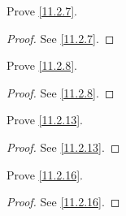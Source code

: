 \exercisesection

\begin{ex}\label{ex:11.2.1}
  Prove \cref{11.2.7}.
\end{ex}

\begin{proof}
  See \cref{11.2.7}.
\end{proof}

\begin{ex}\label{ex:11.2.2}
  Prove \cref{11.2.8}.
\end{ex}

\begin{proof}
  See \cref{11.2.8}.
\end{proof}

\begin{ex}\label{ex:11.2.3}
  Prove \cref{11.2.13}.
\end{ex}

\begin{proof}
  See \cref{11.2.13}.
\end{proof}

\begin{ex}\label{ex:11.2.4}
  Prove \cref{11.2.16}.
\end{ex}

\begin{proof}
  See \cref{11.2.16}.
\end{proof}